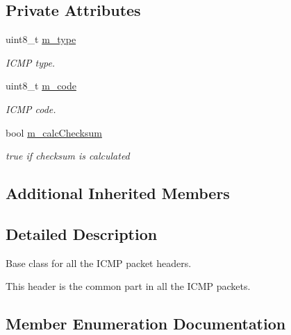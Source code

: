 \subsection*{Private Attributes}
\begin{DoxyCompactItemize}
\item 
uint8\+\_\+t \hyperlink{classns3_1_1Icmpv4Header_a7c62b0fd585e2d7380414dfd6535d0d4}{m\+\_\+type}
\begin{DoxyCompactList}\small\item\em I\+C\+MP type. \end{DoxyCompactList}\item 
uint8\+\_\+t \hyperlink{classns3_1_1Icmpv4Header_a5ec86b8745c4ea8bb3cae7304d53711f}{m\+\_\+code}
\begin{DoxyCompactList}\small\item\em I\+C\+MP code. \end{DoxyCompactList}\item 
bool \hyperlink{classns3_1_1Icmpv4Header_a3e9f1e1d8c3d1300e5bf21e0c034f05c}{m\+\_\+calc\+Checksum}
\begin{DoxyCompactList}\small\item\em true if checksum is calculated \end{DoxyCompactList}\end{DoxyCompactItemize}
\subsection*{Additional Inherited Members}


\subsection{Detailed Description}
Base class for all the I\+C\+MP packet headers. 

This header is the common part in all the I\+C\+MP packets. 

\subsection{Member Enumeration Documentation}
